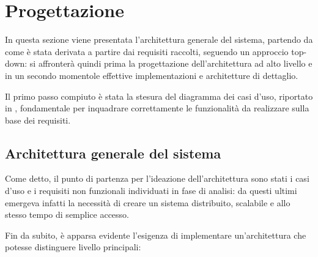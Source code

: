 \section{Progettazione}




In questa sezione viene presentata l'architettura generale del sistema,
partendo da come è stata derivata a partire dai requisiti raccolti, seguendo un approccio top-down:
si affronterà quindi prima la progettazione dell'architettura ad alto livello
e in un secondo momentole effettive implementazioni e architetture di dettaglio.

Il primo passo compiuto è stata la stesura del diagramma dei casi d'uso, riportato in ,
fondamentale per inquadrare correttamente le funzionalità da realizzare sulla base dei requisiti.

\subsection{Architettura generale del sistema}

Come detto, il punto di partenza per l'ideazione dell'architettura sono stati i casi d'uso e i requisiti non funzionali individuati in fase di analisi:
da questi ultimi emergeva infatti la necessità di creare un sistema distribuito, scalabile e allo stesso tempo di semplice accesso.

Fin da subito, è apparsa evidente l'esigenza di implementare un'architettura che potesse distinguere livello principali:


